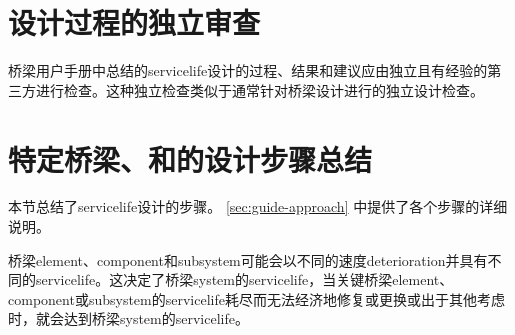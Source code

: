 \section{设计过程的独立审查}


桥梁用户手册中总结的\gls{servicelife}设计的过程、结果和建议应由独立且有经验的第三方进行检查。这种独立检查类似于通常针对桥梁设计进行的独立设计检查。

\section{特定桥梁、和的设计步骤总结}\label{sec:summary-steps}


本节总结了\gls{servicelife}设计的步骤。 \cref{sec:guide-approach} 中提供了各个步骤的详细说明。


桥梁\gls{element}、\gls{component}和\gls{subsystem}可能会以不同的速度\gls*{deterioration}并具有不同的\gls{servicelife}。这决定了桥梁\gls{system}的\gls{servicelife}，当关键桥梁\gls{element}、\gls{component}或\gls{subsystem}的\gls{servicelife}耗尽而无法经济地修复或更换或出于其他考虑时，就会达到桥梁\gls{system}的\gls{servicelife}。

